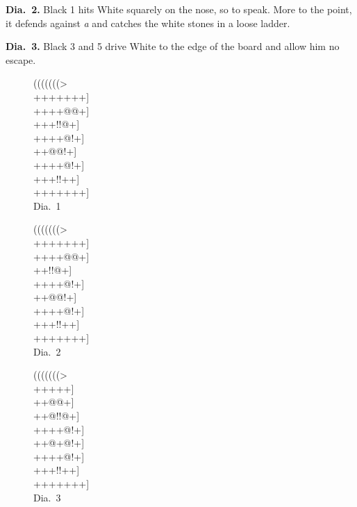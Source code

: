 \documentclass[mcrownvopaper,10pt,twopage,onecolumn,final]{memoir}
\begin{document}
\noindent
\textbf{Dia.\ 2.} Black 1 hits White squarely on the nose, so to speak. More to the
point, it defends against \textit{a} and catches the white stones in a loose ladder.

\noindent
\textbf{Dia.\ 3.} Black 3 and 5 drive White to the edge of the board and allow
him no escape.

\begin{figure}[ht]
    \begin{minipage}[c]{0.33\linewidth}
        \centering    
        {\gnos%
        (((((((>\\
        +++++++]\\
        ++++@@+]\\
        +++!!@+]\\
        ++++@!+]\\
        ++@@!+]\\
        ++++@!+]\\
        +++!!++]\\
        +++++++]\\
        }
        Dia.\ 1
    \end{minipage}%
    \begin{minipage}[c]{0.33\linewidth}
        \centering    
        {\gnos%
        (((((((>\\
        +++++++]\\
        ++++@@+]\\
        ++{\gnosb{}}!!@+]\\
        ++++@!+]\\
        ++@@!+]\\
        ++++@!+]\\
        +++!!++]\\
        +++++++]\\
        }
        Dia.\ 2
    \end{minipage}%
    \begin{minipage}[c]{0.33\linewidth}
        \centering    
        {\gnos%
        (((((((>\\
        ++{\gnosb{}}{\gnosw{}}+++]\\
        ++{\gnosb{}}{\gnosw{}}@@+]\\
        ++@!!@+]\\
        ++++@!+]\\
        ++@+@!+]\\
        ++++@!+]\\
        +++!!++]\\
        +++++++]\\
        }
        Dia.\ 3
    \end{minipage}%
\end{figure}
\end{document}
